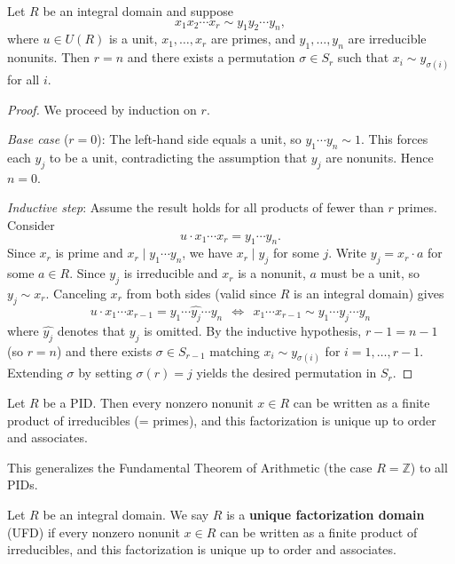 \begin{proposition}
Let $R$ be an integral domain and suppose
\[
 x_1 x_2 \cdots x_r \sim y_1 y_2 \cdots y_n,
\]
where $u \in U(R)$ is a unit, $x_1, \dots, x_r$ are primes, and $y_1, \dots, y_n$ are irreducible nonunits. Then $r = n$ and there exists a permutation $\sigma \in S_r$ such that $x_i \sim y_{\sigma(i)}$ for all $i$.
\end{proposition}

\begin{proof}
We proceed by induction on $r$.

\medskip
\noindent \textit{Base case} ($r = 0$): The left-hand side equals a unit, so $y_1 \cdots y_n \sim 1$. This forces each $y_j$ to be a unit, contradicting the assumption that $y_j$ are nonunits. Hence $n = 0$.

\medskip
\noindent \textit{Inductive step}: Assume the result holds for all products of fewer than $r$ primes. Consider 
$$u \cdot x_1 \cdots x_r = y_1 \cdots y_n.$$ Since $x_r$ is prime and $x_r \mid y_1 \cdots y_n$, we have $x_r \mid y_j$ for some $j$. Write $y_j = x_r \cdot a$ for some $a \in R$. Since $y_j$ is irreducible and $x_r$ is a nonunit, $a$ must be a unit, so $y_j \sim x_r$. Canceling $x_r$ from both sides (valid since $R$ is an integral domain) gives
\[
u \cdot x_1 \cdots x_{r-1} = y_1 \cdots \widehat{y_j} \cdots y_n \ \ 
\Longleftrightarrow \ \ x_1 \cdots x_{r-1} \sim y_1 \cdots \widehat{y_j} \cdots y_n
\]
where $\widehat{y_j}$ denotes that $y_j$ is omitted. By the inductive hypothesis, $r - 1 = n - 1$ (so $r = n$) and there exists $\sigma \in S_{r-1}$ matching $x_i \sim y_{\sigma(i)}$ for $i = 1, \dots, r-1$. Extending $\sigma$ by setting $\sigma(r) = j$ yields the desired permutation in $S_r$.
\end{proof}

\begin{corollary}
Let $R$ be a PID. Then every nonzero nonunit $x \in R$ can be written as a finite product of irreducibles (= primes), and this factorization is unique up to order and associates.
\end{corollary}

\noindent This generalizes the Fundamental Theorem of Arithmetic (the case $R = \mathbb{Z}$) to all PIDs.

\begin{definition}
Let $R$ be an integral domain. We say $R$ is a \textbf{unique factorization domain} (UFD) if every nonzero nonunit $x \in R$ can be written as a finite product of irreducibles, and this factorization is unique up to order and associates.
\end{definition}

